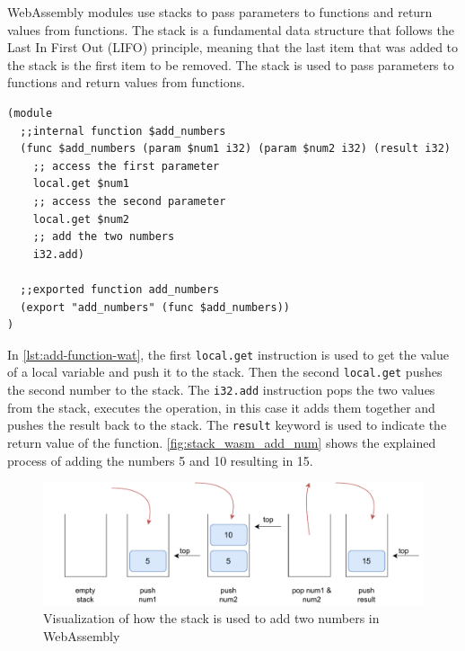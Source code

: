 WebAssembly modules use stacks \cite[sec. 4.2.14]{webassemblycommunitygroup_2023_webassembly} to pass parameters to functions and return values from functions. The stack is a fundamental data structure that follows the Last In First Out (LIFO) principle, meaning that the last item that was added to the stack is the first item to be removed. The stack is used to pass parameters to functions and return values from functions. 
%
\begin{lstlisting}[frame=lines, style=Wasm, caption={A simple functions that adds two numbers and returns the value}, showstringspaces=false, captionpos=b, label={lst:add-function-wat}]
(module
  ;;internal function $add_numbers
  (func $add_numbers (param $num1 i32) (param $num2 i32) (result i32)
    ;; access the first parameter
    local.get $num1
    ;; access the second parameter
    local.get $num2
    ;; add the two numbers
    i32.add)

  ;;exported function add_numbers
  (export "add_numbers" (func $add_numbers))
)
\end{lstlisting}
%
In \autoref{lst:add-function-wat}, the first \texttt{local.get} instruction is used to get the value of a local variable and push it to the stack. Then the second \texttt{local.get} pushes the second number to the stack. The \texttt{i32.add} instruction pops the two values from the stack, executes the operation, in this case it adds them together and pushes the result back to the stack. The \texttt{result} keyword is used to indicate the return value of the function. \autoref{fig:stack_wasm_add_num} shows the explained process of adding the numbers 5 and 10 resulting in 15.

\begin{figure}[H]
  \centering
      \includegraphics[width=1\linewidth]{images/wasm/stack_add_num_wasm.drawio.pdf}
  \caption{Visualization of how the stack is used to add two numbers in WebAssembly}
  \label{fig:stack_wasm_add_num}
\end{figure}